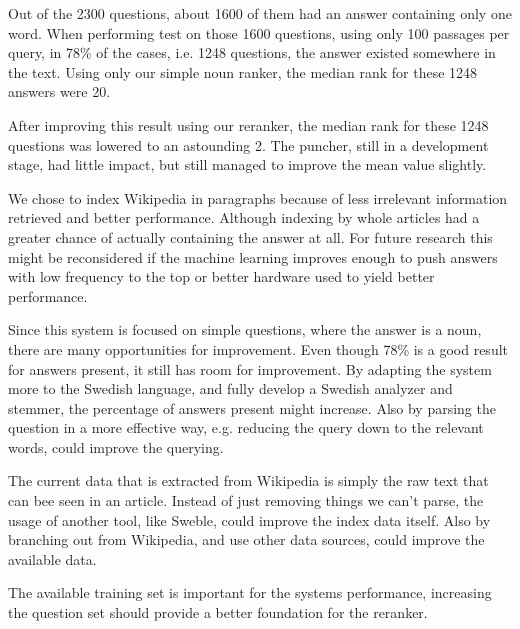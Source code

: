 Out of the 2300 questions, about 1600 of them had an answer containing only one word.
When performing test on those 1600 questions, using only 100 passages per query, 
in 78\% of the cases, i.e. 1248 questions, the answer existed somewhere in the text.
Using only our simple noun ranker, the median rank for these 1248 answers were 20.

After improving this result using our reranker, the median rank for these 1248 questions was lowered to an astounding 2.
The puncher, still in a development stage, had little impact, but still managed to improve the mean value slightly.

We chose to index Wikipedia in paragraphs because of less irrelevant information retrieved and better performance. Although 
indexing by whole articles had a greater chance of actually containing the answer at all.
For future research this might be reconsidered if the machine learning improves enough to push answers with low frequency to the
top or better hardware used to yield better performance.

Since this system is focused on simple questions, where the answer is a noun, there are many opportunities for improvement.
Even though 78\% is a good result for answers present, it still has room for improvement. By adapting the system more to the Swedish language, 
and fully develop a Swedish analyzer and stemmer, the percentage of answers present might increase.
Also by parsing the question in a more effective way, e.g. reducing the query down to the relevant words, could improve the querying.

The current data that is extracted from Wikipedia is simply the raw text that can bee seen in an article. 
Instead of just removing things we can't parse, the usage of another tool, like Sweble, could improve the index data itself.
Also by branching out from Wikipedia, and use other data sources, could improve the available data.

The available training set is important for the systems performance, increasing the question set should provide a better foundation for the reranker.
